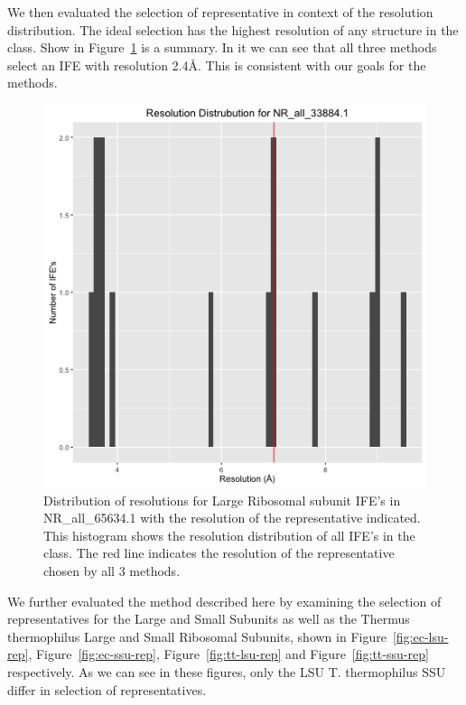 We then evaluated the selection of representative in context of the resolution
distribution. The ideal selection has the highest resolution of any structure in
the class. Show in Figure~\ref{fig:hm-rep-res-dist} is a summary. In it we can
see that all three methods select an IFE with resolution 2.4{\AA}. This is
consistent with our goals for the methods.

\begin{figure}
  \includegraphics[width=\linewidth]{chapter-4/figs/hm-lsu-res}
  \caption{Distribution of resolutions for \HM{} Large Ribosomal subunit IFE’s
    in NR\_all\_65634.1 with the resolution of the representative indicated.
    This histogram shows the resolution distribution of all IFE’s in the
    class. The red line indicates the resolution of the representative chosen by
  all 3 methods.}
  \label{fig:hm-rep-res-dist}
\end{figure}

We further evaluated the method described here by examining the selection of
representatives for the \EC{} Large and Small Subunits as well as the Thermus
thermophilus Large and Small Ribosomal Subunits, shown in
Figure~\ref{fig:ec-lsu-rep}, Figure~\ref{fig:ec-ssu-rep},
Figure~\ref{fig:tt-lsu-rep} and Figure~\ref{fig:tt-ssu-rep} respectively. As we
can see in these figures, only the \EC{} LSU T. thermophilus SSU differ in
selection of representatives.

